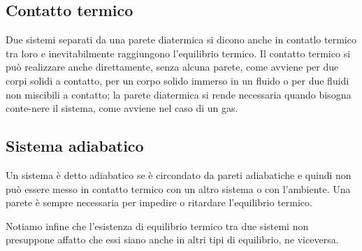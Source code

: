 \documentclass[class=book, crop=false, oneside, 12pt]{standalone}
\begin{document}
\subsection{Contatto termico}

Due sistemi separati da una parete diatermica si dicono anche in contatlo termico tra loro e inevitabilmente raggiungono l'equilibrio termico. 
Il contatto termico si può realizzare anche direttamente, senza alcuna parete, come avviene per due corpi solidi a contatto, per un corpo solido immerso in un fluido o per due fluidi non miscibili a contatto; la parete diatermica si rende necessaria quando bisogna conte-nere il sistema, come avviene nel caso di un gas. 

\subsection{Sistema adiabatico}

Un sistema è detto adiabatico se è circondato da pareti adiabatiche e quindi non può essere messo in contatto termico con un altro sistema o  con l'ambiente. 
Una parete è sempre necessaria per impedire o ritardare l'equilibrio termico. 

Notiamo infine che l'esistenza di equilibrio termico tra due sistemi non presuppone affatto che essi siano anche in altri tipi di equilibrio, ne viceversa.
\end{document}
